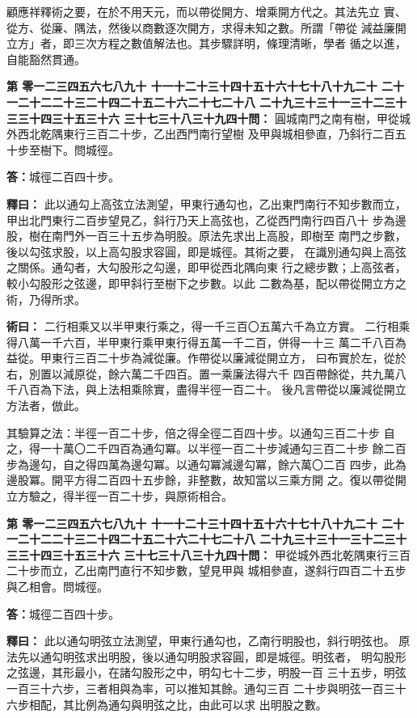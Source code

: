 \documentclass[11pt,a4paper]{article}
\newcounter{probnum}
\newcommand{\chnum}[1]{%
  \ifcase#1 零\or 一\or 二\or 三\or 四\or 五\or 六\or 七\or 八\or 九\or 十\or
    十一\or 十二\or 十三\or 十四\or 十五\or 十六\or 十七\or 十八\or 十九\or 二十\or
    二十一\or 二十二\or 二十三\or 二十四\or 二十五\or 二十六\or 二十七\or 二十八\or
    二十九\or 三十\or 三十一\or 三十二\or 三十三\or 三十四\or 三十五\or 三十六\or
    三十七\or 三十八\or 三十九\or 四十\fi}
\newcommand{\problem}[1]{\stepcounter{probnum}\par\noindent\textbf{第\chnum{\value{probnum}}問：}#1\par}
\newcommand{\answer}[1]{\par\noindent\textbf{答：}#1\par}
\newcommand{\shiyi}[1]{\par\noindent\textbf{釋曰：}#1\par}
\newcommand{\shuyue}[1]{\par\noindent\textbf{術曰：}#1\par}
\begin{document}
顧應祥釋術之要，在於不用天元，而以帶從開方、增乘開方代之。其法先立
實、從方、從廉、隅法，然後以商數逐次開方，求得未知之數。所謂「帶從
減益廉開立方」者，即三次方程之數值解法也。其步驟詳明，條理清晰，學者
循之以進，自能豁然貫通。

\vspace{0.3cm}

\problem{
圓城南門之南有樹，甲從城外西北乾隅東行三百二十步，乙出西門南行望樹
及甲與城相參直，乃斜行二百五十步至樹下。問城徑。
}

\answer{城徑二百四十步。}

\shiyi{
此以通勾上高弦立法測望，甲東行通勾也，乙出東門南行不知步數而立，
甲出北門東行二百步望見乙，斜行乃天上高弦也，乙從西門南行四百八十
步為邊股，樹在南門外一百三十五步為明股。原法先求出上高股，即樹至
南門之步數，後以勾弦求股，以上高勾股求容圓，即是城徑。其術之要，
在識別通勾與上高弦之關係。通勾者，大勾股形之勾邊，即甲從西北隅向東
行之總步數；上高弦者，較小勾股形之弦邊，即甲斜行至樹下之步數。以此
二數為基，配以帶從開立方之術，乃得所求。
}

\shuyue{
二行相乘又以半甲東行乘之，得一千三百〇五萬六千為立方實。
二行相乘得八萬一千六百，半甲東行乘甲東行得五萬一千二百，併得一十三
萬二千八百為益從。甲東行三百二十步為減從廉。作帶從以廉減從開立方，
曰布實於左，從於右，別置以減原從，餘六萬二千四百。置一乘廉法得六千
四百帶餘從，共九萬八千八百為下法，與上法相乘除實，盡得半徑一百二十。
後凡言帶從以廉減從開立方法者，倣此。

其驗算之法：半徑一百二十步，倍之得全徑二百四十步。以通勾三百二十步
自之，得一十萬〇二千四百為通勾冪。以半徑一百二十步減通勾三百二十步
餘二百步為邊勾，自之得四萬為邊勾冪。以通勾冪減邊勾冪，餘六萬〇二百
四步，此為邊股冪。開平方得二百四十五步餘，非整數，故知當以三乘方開
之。復以帶從開立方驗之，得半徑一百二十步，與原術相合。
}

\vspace{0.3cm}
\problem{
甲從城外西北乾隅東行三百二十步而立，乙出南門直行不知步數，望見甲與
城相參直，遂斜行四百二十五步與乙相會。問城徑。
}

\answer{城徑二百四十步。}

\shiyi{
此以通勾明弦立法測望，甲東行通勾也，乙南行明股也，斜行明弦也。
原法先以通勾明弦求出明股，後以通勾明股求容圓，即是城徑。明弦者，
明勾股形之弦邊，其形最小，在諸勾股形之中，明勾七十二步，明股一百
三十五步，明弦一百三十六步，三者相與為率，可以推知其餘。通勾三百
二十步與明弦一百三十六步相配，其比例為通勾與明弦之比，由此可以求
出明股之數。
}
\end{document}
